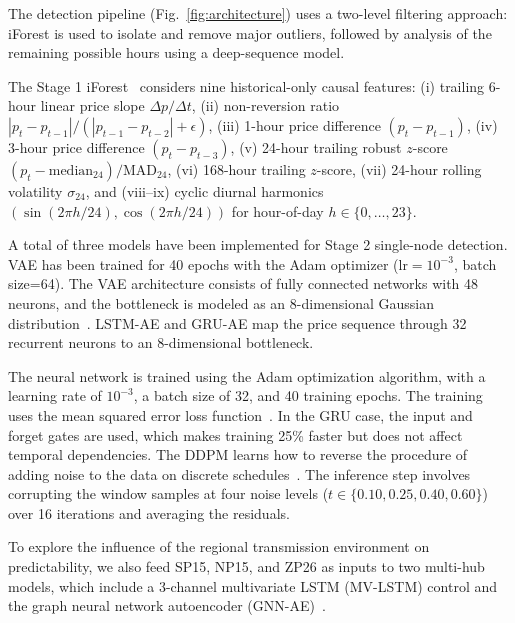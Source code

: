 \documentclass[journal]{IEEEtran}
\begin{document}
The detection pipeline (Fig.~\ref{fig:architecture}) uses a two-level filtering approach: iForest is used to isolate and remove major outliers, followed by analysis of the remaining possible hours using a deep-sequence model.

The Stage 1 iForest~\cite{IForest} considers nine historical-only causal features: (i) trailing 6-hour linear price slope $\Delta p / \Delta t$, (ii) non-reversion ratio $|p_t - p_{t-1}| / (|p_{t-1} - p_{t-2}| + \epsilon)$, (iii) 1-hour price difference $(p_t - p_{t-1})$, (iv) 3-hour price difference $(p_t - p_{t-3})$, (v) 24-hour trailing robust $z$-score $(p_t - \text{median}_{24}) / \text{MAD}_{24}$, (vi) 168-hour trailing $z$-score, (vii) 24-hour rolling volatility $\sigma_{24}$, and (viii--ix) cyclic diurnal harmonics $(\sin(2\pi h / 24), \cos(2\pi h / 24))$ for hour-of-day $h \in \{0, \dots, 23\}$.

A total of three models have been implemented for Stage 2 single-node detection. VAE has been trained for 40 epochs with the Adam optimizer ($\text{lr}=10^{-3}$, batch size=64). The VAE architecture consists of fully connected networks with 48 neurons, and the bottleneck is modeled as an 8-dimensional Gaussian distribution~\cite{VAE}. LSTM-AE and GRU-AE map the price sequence through 32 recurrent neurons to an 8-dimensional bottleneck.

The neural network is trained using the Adam optimization algorithm, with a learning rate of $10^{-3}$, a batch size of 32, and 40 training epochs. The training uses the mean squared error loss function~\cite{Audibert_USAD}. In the GRU case, the input and forget gates are used, which makes training 25\% faster but does not affect temporal dependencies. The DDPM learns how to reverse the procedure of adding noise to the data on discrete schedules~\cite{DDPM}. The inference step involves corrupting the window samples at four noise levels ($t \in \{0.10, 0.25, 0.40, 0.60\}$) over 16 iterations and averaging the residuals.

To explore the influence of the regional transmission environment on predictability, we also feed SP15, NP15, and ZP26 as inputs to two multi-hub models, which include a 3-channel multivariate LSTM (MV-LSTM) control and the graph neural network autoencoder (GNN-AE)~\cite{GAT}.
\end{document}
